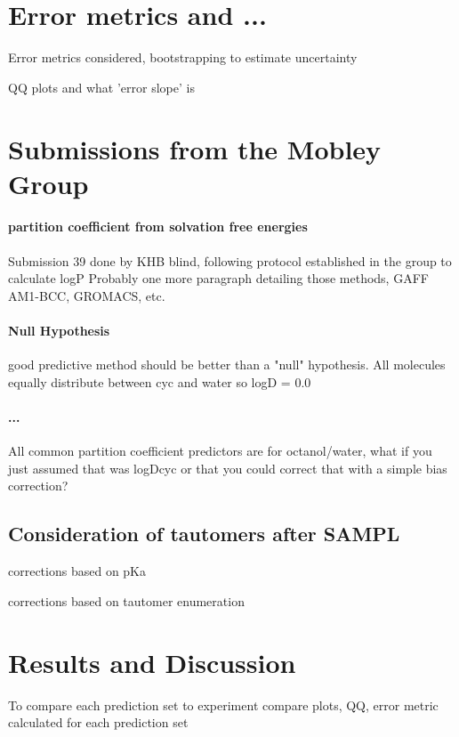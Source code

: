 \section{Error metrics and ...}
\label{analysis}
Error metrics considered, bootstrapping to estimate uncertainty

QQ plots and what 'error slope' is


\section{Submissions from the Mobley Group}
\label{methods:1}
\paragraph{partition coefficient from solvation free energies}
Submission 39 done by KHB blind, following protocol established in the group to calculate logP %
Probably one more paragraph detailing those methods, GAFF AM1-BCC, GROMACS, etc.

\paragraph{Null Hypothesis}
good predictive method should be better than a "null" hypothesis. All molecules equally distribute between cyc and water so logD = 0.0

\paragraph{...} %
All common partition coefficient predictors are for octanol/water, what if you just assumed that was logDcyc or that you could correct that with a simple bias correction?

\subsection{Consideration of tautomers after SAMPL}
\label{methods:post}
corrections based on pKa

corrections based on tautomer enumeration

\section{Results and Discussion}
\label{results:1}
To compare each prediction set to experiment compare plots, QQ, error metric calculated for each prediction set

